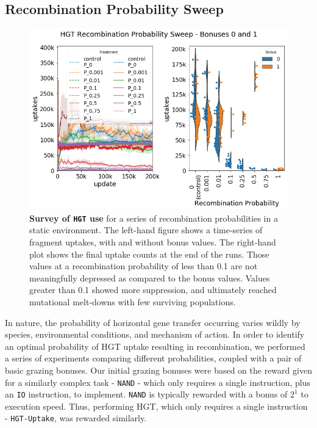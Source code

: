 \documentclass[PhD]{msu-thesis}
\begin{document}
\begin{appendices}
\section{Recombination Probability Sweep}
	\begin{figure}[!h]
	\includegraphics[width=0.95\columnwidth]{figures/A2/hgt-probabilitysweep-hgtuse.png}
	\caption{\textbf{Survey of \texttt{HGT} use} for a series of recombination probabilities in a static environment. The left-hand figure shows a time-series of fragment uptakes, with and without bonus values. The right-hand plot shows the final uptake counts at the end of the runs. Those values at a recombination probability of less than 0.1 are not meaningfully depressed as compared to the bonus values. Values greater than 0.1 showed more suppression, and ultimately reached mutational melt-downs with few surviving populations.  %
	}
	\label{fig:a2-hgt-probabilitysweep-hgtuse}
	\end{figure}
In nature, the probability of horizontal gene transfer occurring varies wildly by species, environmental conditions, and mechanism of action. In order to identify an optimal probability of HGT uptake resulting in recombination, we performed a series of experiments comparing different probabilities, coupled with a pair of basic grazing bonuses. Our initial grazing bonuses were based on the reward given for a similarly complex task - \texttt{NAND} - which only requires a single instruction, plus an \texttt{IO} instruction, to implement. \texttt{NAND} is typically rewarded with a bonus of $2^1$ to execution speed. Thus, performing HGT, which only requires a single instruction - \texttt{HGT-Uptake}, was rewarded similarly.




\end{appendices}
\end{document}
